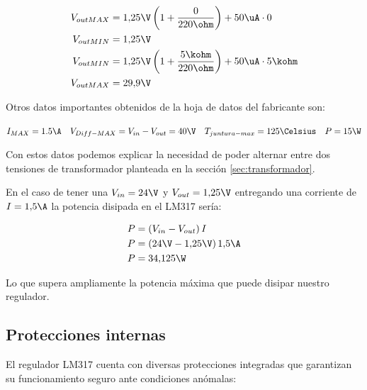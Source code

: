 \begin{equation}
  \begin{aligned}
    V_{out MAX} &= 1{,}25\V \left(1 + \frac{0}{220\ohm} \right) + 50\uA \cdot 0 \\
    V_{out MIN} &= 1{,}25 \V \\
    V_{out MIN} &= 1{,}25\V \left(1 + \frac{5\kohm}{220\ohm} \right) + 50\uA \cdot 5\kohm \\
    V_{out MAX} &= 29{,}9 \V \\
  \end{aligned}
\end{equation}

Otros datos importantes obtenidos de la hoja de datos del fabricante son:

\begin{center}
  $I_{MAX}=1.5\A \quad V_{Diff-MAX}=V_{in}-V_{out}=40\V \quad T_{juntura-max}=125\Celsius \quad P=15\W$ 
\end{center}

Con estos datos podemos explicar la necesidad de poder alternar entre dos tensiones de transformador planteada
en la sección \ref{sec:transformador}.

En el caso de tener una $V_{in}=24\V$ y $V_{out}=1{,}25\V$ entregando una corriente de $I=1{,}5\A$ la potencia disipada
en el LM317 sería:

\begin{equation}
  \begin{aligned}
    P &= \left( V_{in} - V_{out}\right) I \\
    P &= \left( 24\V - 1{,}25\V\right) 1{,}5 \A \\
    P &= 34{,}125 \W
  \end{aligned}
\end{equation}

Lo que supera ampliamente la potencia máxima que puede disipar nuestro regulador.


\subsection{Protecciones internas}
  El regulador LM317 cuenta con diversas protecciones integradas que garantizan su funcionamiento seguro ante
  condiciones anómalas:

